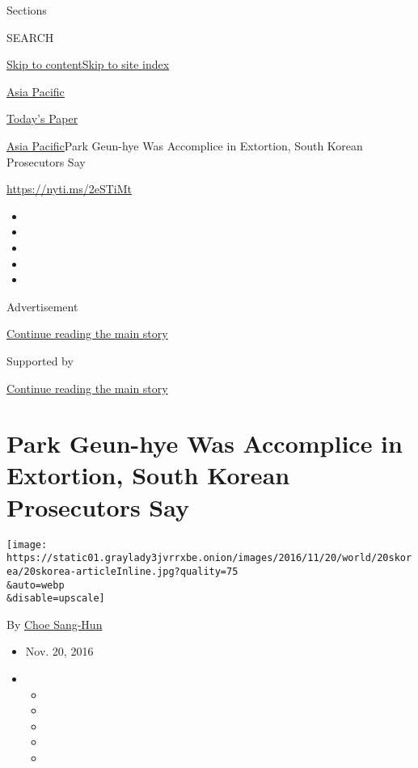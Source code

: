 Sections

SEARCH

\protect\hyperlink{site-content}{Skip to
content}\protect\hyperlink{site-index}{Skip to site index}

\href{https://www.nytimes3xbfgragh.onion/section/world/asia}{Asia
Pacific}

\href{https://myaccount.nytimes3xbfgragh.onion/auth/login?response_type=cookie\&client_id=vi}{}

\href{https://www.nytimes3xbfgragh.onion/section/todayspaper}{Today's
Paper}

\href{/section/world/asia}{Asia Pacific}\textbar{}Park Geun-hye Was
Accomplice in Extortion, South Korean Prosecutors Say

\url{https://nyti.ms/2eSTiMt}

\begin{itemize}
\item
\item
\item
\item
\item
\end{itemize}

Advertisement

\protect\hyperlink{after-top}{Continue reading the main story}

Supported by

\protect\hyperlink{after-sponsor}{Continue reading the main story}

\hypertarget{park-geun-hye-was-accomplice-in-extortion-south-korean-prosecutors-say}{%
\section{Park Geun-hye Was Accomplice in Extortion, South Korean
Prosecutors
Say}\label{park-geun-hye-was-accomplice-in-extortion-south-korean-prosecutors-say}}

\texttt{[image: https://static01.graylady3jvrrxbe.onion/images/2016/11/20/world/20skorea/20skorea-articleInline.jpg?quality=75\\\&auto=webp\\\&disable=upscale]}

By \href{http://www.nytimes3xbfgragh.onion/by/choe-sang-hun}{Choe
Sang-Hun}

\begin{itemize}
\item
  Nov. 20, 2016
\item
  \begin{itemize}
  \item
  \item
  \item
  \item
  \item
  \end{itemize}
\end{itemize}

